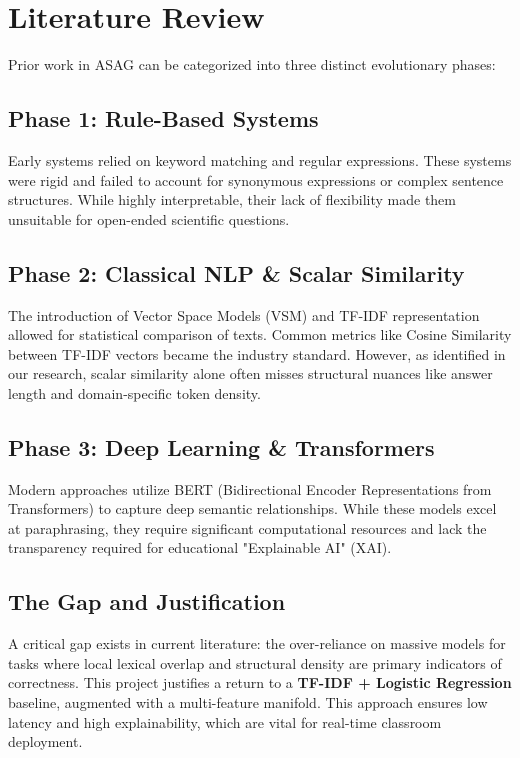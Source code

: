 \documentclass[conference]{IEEEtran}
\begin{document}
\section{Literature Review}
Prior work in ASAG can be categorized into three distinct evolutionary phases:

\subsection{Phase 1: Rule-Based Systems}
Early systems relied on keyword matching and regular expressions. These systems were rigid and failed to account for synonymous expressions or complex sentence structures. While highly interpretable, their lack of flexibility made them unsuitable for open-ended scientific questions.

\subsection{Phase 2: Classical NLP \& Scalar Similarity}
The introduction of Vector Space Models (VSM) and TF-IDF representation allowed for statistical comparison of texts. Common metrics like Cosine Similarity between TF-IDF vectors became the industry standard. However, as identified in our research, scalar similarity alone often misses structural nuances like answer length and domain-specific token density.

\subsection{Phase 3: Deep Learning \& Transformers}
Modern approaches utilize BERT (Bidirectional Encoder Representations from Transformers) to capture deep semantic relationships. While these models excel at paraphrasing, they require significant computational resources and lack the transparency required for educational "Explainable AI" (XAI).

\subsection{The Gap and Justification}
A critical gap exists in current literature: the over-reliance on massive models for tasks where local lexical overlap and structural density are primary indicators of correctness. This project justifies a return to a \textbf{TF-IDF + Logistic Regression} baseline, augmented with a multi-feature manifold. This approach ensures low latency and high explainability, which are vital for real-time classroom deployment.
\end{document}
